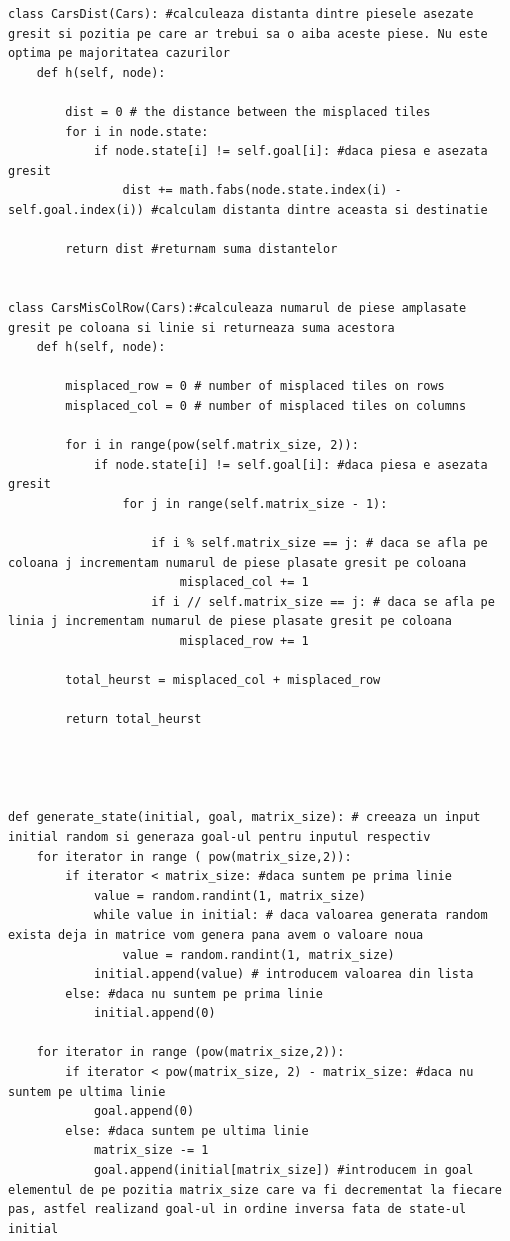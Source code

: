 \documentclass[14pt]{article}
\begin{document}
\begin{lstlisting}
class CarsDist(Cars): #calculeaza distanta dintre piesele asezate gresit si pozitia pe care ar trebui sa o aiba aceste piese. Nu este optima pe majoritatea cazurilor
    def h(self, node):

        dist = 0 # the distance between the misplaced tiles
        for i in node.state:
            if node.state[i] != self.goal[i]: #daca piesa e asezata gresit
                dist += math.fabs(node.state.index(i) - self.goal.index(i)) #calculam distanta dintre aceasta si destinatie

        return dist #returnam suma distantelor
    
        
class CarsMisColRow(Cars):#calculeaza numarul de piese amplasate gresit pe coloana si linie si returneaza suma acestora
    def h(self, node):

        misplaced_row = 0 # number of misplaced tiles on rows
        misplaced_col = 0 # number of misplaced tiles on columns

        for i in range(pow(self.matrix_size, 2)):
            if node.state[i] != self.goal[i]: #daca piesa e asezata gresit
                for j in range(self.matrix_size - 1):

                    if i % self.matrix_size == j: # daca se afla pe coloana j incrementam numarul de piese plasate gresit pe coloana
                        misplaced_col += 1
                    if i // self.matrix_size == j: # daca se afla pe linia j incrementam numarul de piese plasate gresit pe coloana
                        misplaced_row += 1

        total_heurst = misplaced_col + misplaced_row
        
        return total_heurst




def generate_state(initial, goal, matrix_size): # creeaza un input initial random si generaza goal-ul pentru inputul respectiv
    for iterator in range ( pow(matrix_size,2)):
        if iterator < matrix_size: #daca suntem pe prima linie
            value = random.randint(1, matrix_size)
            while value in initial: # daca valoarea generata random exista deja in matrice vom genera pana avem o valoare noua
                value = random.randint(1, matrix_size)
            initial.append(value) # introducem valoarea din lista
        else: #daca nu suntem pe prima linie
            initial.append(0)
        
    for iterator in range (pow(matrix_size,2)):
        if iterator < pow(matrix_size, 2) - matrix_size: #daca nu suntem pe ultima linie
            goal.append(0)
        else: #daca suntem pe ultima linie
            matrix_size -= 1
            goal.append(initial[matrix_size]) #introducem in goal elementul de pe pozitia matrix_size care va fi decrementat la fiecare pas, astfel realizand goal-ul in ordine inversa fata de state-ul initial


\end{lstlisting}
\end{document}
